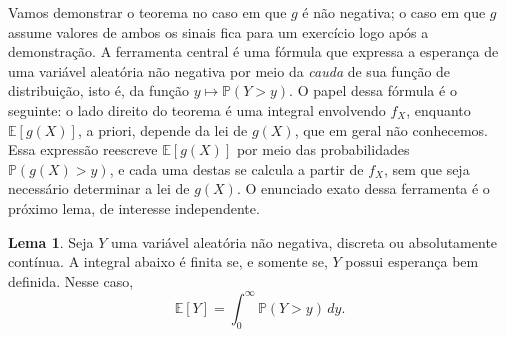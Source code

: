 \documentclass[12pt,portuguese]{article}
\theoremstyle{definition}
\newtheorem{lemma}[lemma]{Lema}
\theoremstyle{plainexercise}
\theoremstyle{starredexercise}
\theoremstyle{definition}
\begin{document}
Vamos demonstrar o teorema no caso em que $g$ é não negativa; o caso
em que $g$ assume valores de ambos os sinais fica para um exercício
logo após a demonstração. A ferramenta central é uma
fórmula que expressa a esperança de uma variável aleatória não negativa
por meio da \emph{cauda} de sua função de distribuição, isto é, da função
$y \mapsto \mathbb{P}(Y > y)$. O papel dessa fórmula é o seguinte: o lado
direito do teorema é uma integral envolvendo $f_X$, enquanto
$\mathbb{E}[g(X)]$, a priori, depende da lei de $g(X)$, que em geral não
conhecemos. Essa expressão reescreve $\mathbb{E}[g(X)]$ por meio das
probabilidades $\mathbb{P}(g(X) > y)$, e cada uma destas se calcula a
partir de $f_X$, sem que seja necessário determinar a lei de $g(X)$. O
enunciado exato dessa ferramenta é o próximo lema, de interesse
independente.

\begin{lemma}\label{lem:formula-cauda}
  Seja $Y$ uma variável aleatória não negativa, discreta ou absolutamente
  contínua. A integral abaixo é finita se, e somente se, $Y$ possui
  esperança bem definida. Nesse caso,
  \begin{equation}\label{eq:formula-cauda}
    \mathbb{E}[Y] = \int_{0}^{\infty} \mathbb{P}(Y > y)\,dy.
  \end{equation}
\end{lemma}
\end{document}
